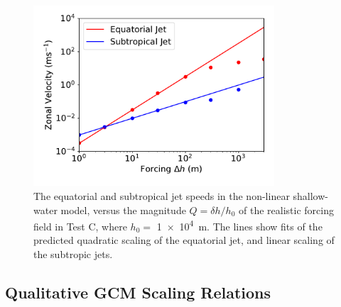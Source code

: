 

\begin{figure}
  \centering
    \includegraphics[width=0.8\textwidth]{figures/eqm-zonal-flow/u_Q_scaling.pdf}
  \caption{The equatorial and subtropical jet speeds in the non-linear shallow-water model, versus the magnitude $Q = \delta h /h_{0}$ of the realistic forcing field in Test C, where $h_{0} =$ \SI{1e4}{\metre}. The lines show fits of the predicted quadratic scaling of the equatorial jet, and linear scaling of the subtropic jets.}
  \label{fig:u_Q_scaling}
\end{figure}



\subsection{Qualitative GCM Scaling Relations}\label{fig:gcm-qual-scaling}

